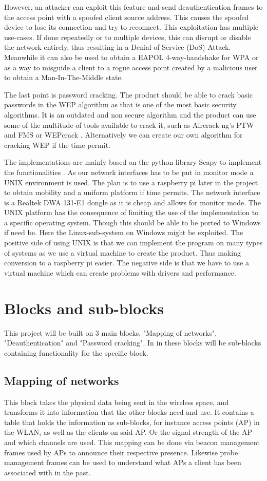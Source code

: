 However, an attacker can exploit this feature and send deauthentication frames to the access point with a spoofed client source address. This causes the spoofed device to lose its connection and try to reconnect. This exploitation has multiple use-cases. If done repeatedly or to multiple devices, this can disrupt or disable the network entirely, thus resulting in a Denial-of-Service (DoS) Attack. Meanwhile it can also be used to obtain a EAPOL 4-way-handshake for WPA or as a way to misguide a client to a rogue access point created by a malicious user to obtain a Man-In-The-Middle state. 

The last point is password cracking. The product should be able to crack basic passwords in the WEP algorithm as that is one of the most basic security algorithms. It is an outdated and non secure algorithm and the product can use some of the multitude of tools available to crack it, such as Aircrack-ng's PTW and FMS or WEPcrack \cite{aircrack-ng}. Alternatively we can create our own algorithm for cracking WEP if the time permit.

The implementations are mainly based on the python library Scapy to implement the functionalities \cite{scapy}. As our network interfaces has to be put in monitor mode a UNIX environment is used. The plan is to use a raspberry pi later in the project to obtain mobility and a uniform platform if time permits. 
The network interface is a Realtek DWA 131-E1 dongle as it is cheap and allows for monitor mode. The UNIX platform has the consequence of limiting the use of the implementation to a specific operating system. Though this should be able to be ported to Windows if need be. Here the Linux-sub-system on Windows might be exploited.
The positive side of using UNIX is that we can implement the program on many types of systems as we use a virtual machine to create the product. Thus making conversion to a raspberry pi easier. The negative side is that we have to use a virtual machine which can create problems with drivers and performance. 

\section{Blocks and sub-blocks}

This project will be built on 3 main blocks, "Mapping of networks", "Deauthentication" and "Password cracking". In in these blocks will be sub-blocks containing functionality for the specific block. 

\subsection{Mapping of networks}
This block takes the physical data being sent in the wireless space, and transforms it into information that the other blocks need and use. It contains a table that holds the information as sub-blocks, for instance access points (AP) in the WLAN, as well as the clients on said AP. Or the signal strength of the AP and which channels are used. This mapping can be done via beacon management frames used by APs to announce their respective presence. Likewise probe management frames can be used to understand what APs a client has been associated with in the past.

